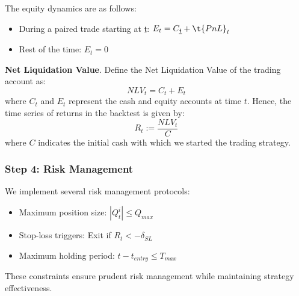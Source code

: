 The equity dynamics are as follows: 
\begin{itemize}
  \item During a paired trade starting at $\underline{\mathfrak{t}}$: 
$
E_t = C_{\underline{\mathfrak{t}}} + \t{PnL}_t
$
  \item Rest of the time: $E_t = 0$
\end{itemize}

\noindent \textbf{Net Liquidation Value}. Define the Net Liquidation Value of the trading account as: 
$$
NLV _t = C_t + E_t
$$
where $C_t$ and $E_t$ represent the cash and equity accounts at time $t$. 
Hence, the time series of returns in the backtest is given by: 
$$
R_t := \frac{NLV_t}{C}
$$
where $C$ indicates the initial cash with which we started the trading strategy.

\subsubsection{Step 4: Risk Management}

We implement several risk management protocols:

\begin{itemize}
\item Maximum position size: $|Q_t^i| \leq Q_{max}$
\item Stop-loss triggers: Exit if $R_t < -\delta_{SL}$
\item Maximum holding period: $t - t_{entry} \leq T_{max}$
\end{itemize}

These constraints ensure prudent risk management while maintaining strategy effectiveness.




